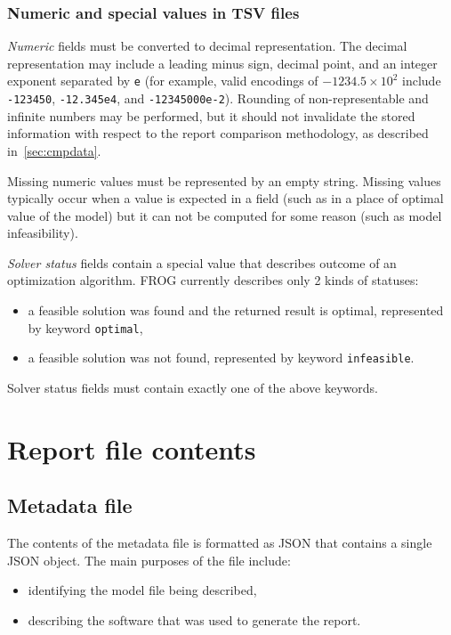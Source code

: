 \subsubsection{Numeric and special values in TSV files}
\emph{Numeric} fields must be converted to decimal representation. The decimal representation may include a leading minus sign, decimal point, and an integer exponent separated by \verb|e| (for example, valid encodings of $-1234.5\times10^2$ include \verb|-123450|, \verb|-12.345e4|, and \verb|-12345000e-2|). Rounding of non-representable and infinite numbers may be performed, but it should not invalidate the stored information with respect to the report comparison methodology, as described in~\cref{sec:cmpdata}.

Missing numeric values must be represented by an empty string. Missing values typically occur when a value is expected in a field (such as in a place of optimal value of the model) but it can not be computed for some reason (such as model infeasibility).

\emph{Solver status} fields contain a special value that describes outcome of an optimization algorithm. FROG currently describes only 2 kinds of statuses:
\begin{itemize}
\item a feasible solution was found and the returned result is optimal, represented by keyword \verb|optimal|,
\item a feasible solution was not found, represented by keyword \verb|infeasible|.
\end{itemize}
Solver status fields must contain exactly one of the above keywords.

\section{Report file contents}

\subsection{Metadata file}
\label{sec:meta}

The contents of the metadata file is formatted as JSON that contains a single JSON object. The main purposes of the file include:
\begin{itemize}
\item identifying the model file being described,
\item describing the software that was used to generate the report.
\end{itemize}

